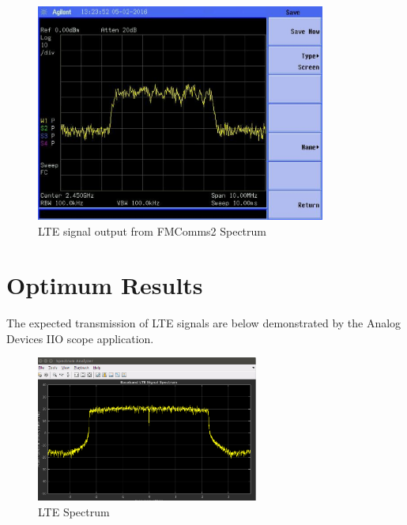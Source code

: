 \begin{figure}[htbp]
    \centering
    \includegraphics[width=0.85\textwidth]{./figures/lte_5m}
    \caption{ LTE signal output from FMComms2 Spectrum
    \label{fig:lte5m}}
\end{figure}

\vfill
\clearpage

%
%

\section{Optimum Results}
\label{result:optimum}

The expected transmission of LTE signals are below demonstrated by the Analog
Devices IIO scope application.

\begin{figure}[htbp]
    \centering
    \includegraphics[width=0.65\textwidth]{./figures/lte_spectrum_iio}
    \caption{ LTE Spectrum
    \label{fig:ltespectrumiio}}
\end{figure}

